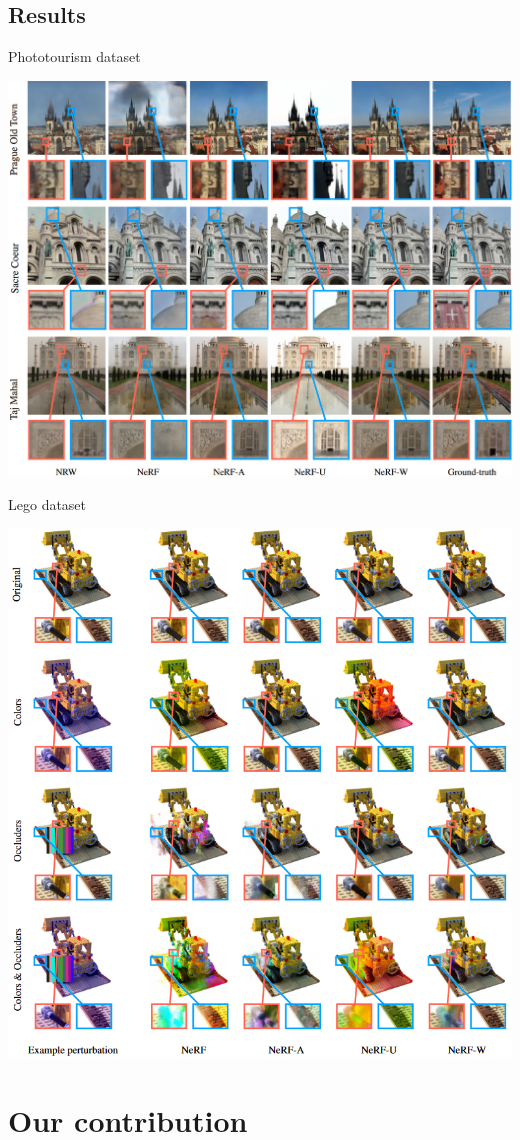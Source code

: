 \documentclass[aspectratio=1610,handout]{beamer}
\begin{document}
\subsection{Results}
\begin{frame}{Phototourism dataset}
    \begin{center}
        \includegraphics[width=.69\textwidth]{res-photo.png}
    \end{center}
\end{frame}
\begin{frame}{Lego dataset}
    \begin{center}
        \includegraphics[width=.51\textwidth]{results-lego.png}
    \end{center}
\end{frame}

\section{Our contribution}
\end{document}
